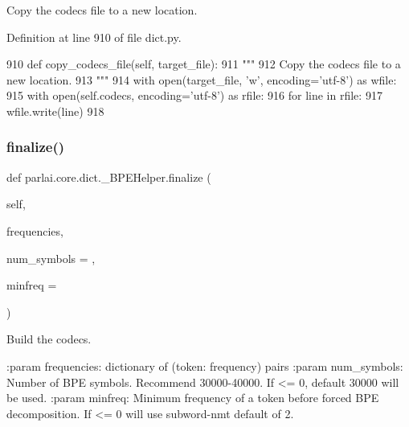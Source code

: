 \begin{DoxyVerb}Copy the codecs file to a new location.
\end{DoxyVerb}
 

Definition at line 910 of file dict.\+py.


\begin{DoxyCode}
910     \textcolor{keyword}{def }copy\_codecs\_file(self, target\_file):
911         \textcolor{stringliteral}{"""}
912 \textcolor{stringliteral}{        Copy the codecs file to a new location.}
913 \textcolor{stringliteral}{        """}
914         with open(target\_file, \textcolor{stringliteral}{'w'}, encoding=\textcolor{stringliteral}{'utf-8'}) \textcolor{keyword}{as} wfile:
915             with open(self.codecs, encoding=\textcolor{stringliteral}{'utf-8'}) \textcolor{keyword}{as} rfile:
916                 \textcolor{keywordflow}{for} line \textcolor{keywordflow}{in} rfile:
917                     wfile.write(line)
918 \end{DoxyCode}
\mbox{\label{classparlai_1_1core_1_1dict_1_1__BPEHelper_ae93cf51522695ac3f45fc19eee94f64c}} 
\subsubsection{\texorpdfstring{finalize()}{finalize()}}
{\footnotesize\ttfamily def parlai.\+core.\+dict.\+\_\+\+B\+P\+E\+Helper.\+finalize (\begin{DoxyParamCaption}\item[{}]{self,  }\item[{}]{frequencies,  }\item[{}]{num\+\_\+symbols = {},  }\item[{}]{minfreq = {} }\end{DoxyParamCaption})}

\begin{DoxyVerb}Build the codecs.

:param frequencies:
    dictionary of (token: frequency) pairs
:param num_symbols:
    Number of BPE symbols. Recommend 30000-40000.  If <= 0, default
    30000 will be used.
:param minfreq:
    Minimum frequency of a token before forced BPE decomposition. If <=
    0 will use subword-nmt default of 2.
\end{DoxyVerb}
 

